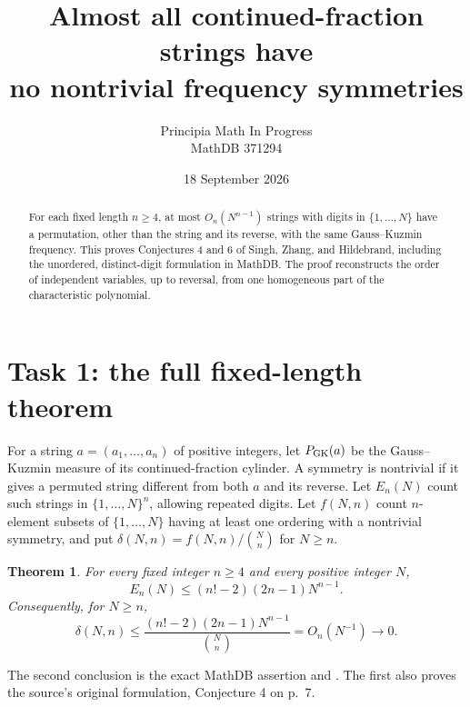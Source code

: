 \documentclass[11pt]{article}
\title{Almost all continued-fraction strings have\\ no nontrivial frequency symmetries}
\author{Principia Math In Progress\\MathDB 371294}
\date{18 September 2026}
\newtheorem{theorem}{Theorem}
\begin{document}
\maketitle
\begin{abstract}
For each fixed length $n\ge4$, at most $O_n(N^{n-1})$ strings with digits
in $\{1,\ldots,N\}$ have a permutation, other than the string and its
reverse, with the same Gauss--Kuzmin frequency. This proves Conjectures
4 and 6 of Singh, Zhang, and Hildebrand, including the unordered,
distinct-digit formulation in MathDB. The proof reconstructs the order
of independent variables, up to reversal, from one homogeneous part
of the characteristic polynomial.
\end{abstract}

\section*{Task 1: the full fixed-length theorem}
For a string $a=(a_1,\ldots,a_n)$ of positive integers, let $P_{\rm GK}(a)$
be the Gauss--Kuzmin measure of its continued-fraction cylinder.
A symmetry is nontrivial if it gives a permuted string different from
both $a$ and its reverse. Let $E_n(N)$ count such strings in
$\{1,\ldots,N\}^n$, allowing repeated digits. Let $f(N,n)$ count
$n$-element subsets of $\{1,\ldots,N\}$ having at least one ordering
with a nontrivial symmetry, and put
$\delta(N,n)=f(N,n)/\binom Nn$ for $N\ge n$.

\begin{theorem}\label{thm:main}
For every fixed integer $n\ge4$ and every positive integer $N$,
\[
 E_n(N)\le (n!-2)(2n-1)N^{n-1}.
\]
Consequently, for $N\ge n$,
\[
 \delta(N,n)\le
 \frac{(n!-2)(2n-1)N^{n-1}}{\binom Nn}
 =O_n(N^{-1})\longrightarrow0.
\]
\end{theorem}
The second conclusion is the exact MathDB assertion and
\cite[Conjecture 6, p.~29]{SZH}. The first also proves the
source's original formulation, Conjecture 4 on p.~7.
\end{document}
